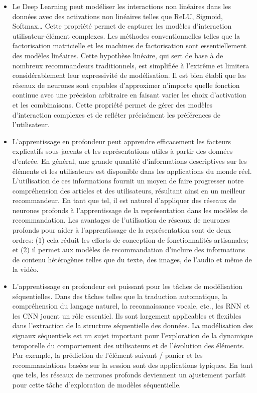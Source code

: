         \begin{itemize}[label=•] 
        \setlength{\itemsep}{5pt}
        
        \item Le Deep Learning peut modéliser les interactions non linéaires dans les données avec des activations non linéaires telles que ReLU, Sigmoid, Softmax… Cette propriété permet de capturer les modèles d'interaction utilisateur-élément complexes. 
        Les méthodes conventionnelles telles que la factorisation matricielle et les machines de factorisation sont essentiellement des modèles linéaires. Cette hypothèse linéaire, qui sert de base à de nombreux recommandeurs traditionnels, est simplifiée à l'extrême et limitera considérablement leur expressivité de modélisation. 
        Il est bien établi que les réseaux de neurones sont capables d'approximer n'importe quelle fonction continue avec une précision arbitraire en faisant varier les choix d'activation et les combinaisons. Cette propriété permet de gérer des modèles d'interaction complexes et de refléter précisément les préférences de l'utilisateur.
        
        \item L'apprentissage en profondeur peut apprendre efficacement les facteurs explicatifs sous-jacents et les représentations utiles à partir des données d'entrée. En général, une grande quantité d'informations descriptives sur les éléments et les utilisateurs est disponible dans les applications du monde réel. L'utilisation de ces informations fournit un moyen de faire progresser notre compréhension des articles et des utilisateurs, résultant ainsi en un meilleur recommandeur. 
        En tant que tel, il est naturel d'appliquer des réseaux de neurones profonds à l'apprentissage de la représentation dans les modèles de recommandation. Les avantages de l'utilisation de réseaux de neurones profonds pour aider à l'apprentissage de la représentation sont de deux ordres: (1) cela réduit les efforts de conception de fonctionnalités artisanales; et (2) il permet aux modèles de recommandation d'inclure des informations de contenu hétérogènes telles que du texte, des images, de l'audio et même de la vidéo.
        
        \item L'apprentissage en profondeur est puissant pour les tâches de modélisation séquentielles. Dans des tâches telles que la traduction automatique, la compréhension du langage naturel, la reconnaissance vocale, etc., les RNN et les CNN jouent un rôle essentiel. Ils sont largement applicables et flexibles dans l'extraction de la structure séquentielle des données. La modélisation des signaux séquentiels est un sujet important pour l'exploration de la dynamique temporelle du comportement des utilisateurs et de l'évolution des éléments. Par exemple, la prédiction de l'élément suivant / panier et les recommandations basées sur la session sont des applications typiques. En tant que tels, les réseaux de neurones profonds deviennent un ajustement parfait pour cette tâche d'exploration de modèles séquentielle.
        

\end{itemize}
